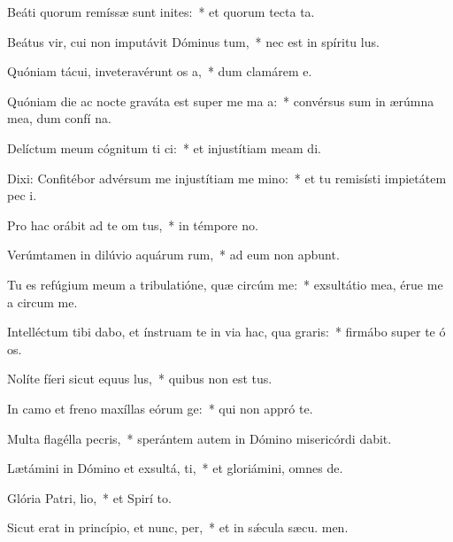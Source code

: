 \item Beáti quorum remíssæ sunt inites:~* et quorum tecta  ta.
\item Beátus vir, cui non imputávit Dóminus tum,~* nec est in spíritu  lus.
\item Quóniam tácui, inveteravérunt os a,~* dum clamárem  e.
\item Quóniam die ac nocte graváta est super me ma a:~* convérsus sum in ærúmna mea, dum confí na.
\item Delíctum meum cógnitum ti ci:~* et injustítiam meam  di.
\item Dixi: Confitébor advérsum me injustítiam me mino:~* et tu remisísti impietátem pec i.
\item Pro hac orábit ad te om tus,~* in témpore no.
\item Verúmtamen in dilúvio aquárum rum,~* ad eum non apbunt.
\item Tu es refúgium meum a tribulatióne, quæ circúm me:~* exsultátio mea, érue me a circum me.
\item Intelléctum tibi dabo, et ínstruam te in via hac, qua graris:~* firmábo super te ó os.
\item Nolíte fíeri sicut equus  lus,~* quibus non est tus.
\item In camo et freno maxíllas eórum ge:~* qui non appró  te.
\item Multa flagélla pecris,~* sperántem autem in Dómino misericórdi dabit.
\item Lætámini in Dómino et exsultá, ti,~* et gloriámini, omnes  de.
\item Glória Patri,  lio,~* et Spirí to.
\item Sicut erat in princípio, et nunc,  per,~* et in sǽcula sæcu. men.
